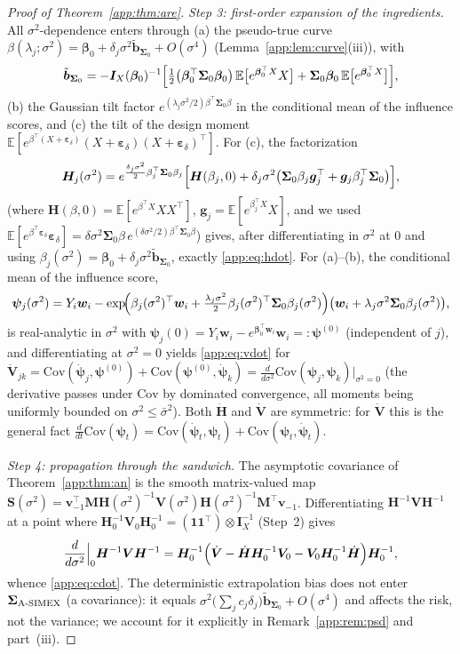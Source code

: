 \documentclass[11pt]{article}
\theoremstyle{plain}
\theoremstyle{definition}
\newcommand{\E}{\mathbb{E}}
\newcommand{\Cov}{\mathrm{Cov}}
\newcommand{\bet}{\bm{\beta}}
\newcommand{\beps}{\bm{\varepsilon}}
\newcommand{\bSig}{\bm{\Sigma}}
\newcommand{\btH}{\bm{H}}
\newcommand{\btV}{\bm{V}}
\newcommand{\asimex}{\textup{A-SIMEX}}
\begin{document}
\begin{proof}[Proof of Theorem~\ref{app:thm:are}]
\emph{Step 3: first-order expansion of the ingredients.} All
$\sigma^2$-dependence enters through (a) the pseudo-true curve
$\beta(\lambda_j;\sigma^2)=\bet_0+\delta_j\sigma^2
\tilde{\bm b}_{\bSig_0}+O(\sigma^4)$ (Lemma~\ref{app:lem:curve}(iii)),
with
\[
  \tilde{\bm b}_{\bSig_0}
  =-\bm I_X(\bet_0)^{-1}\Bigl[
    \tfrac12\bigl(\bet_0^\top\bSig_0\bet_0\bigr)\,
    \E\bigl[e^{\bet_0^\top X}X\bigr]
    +\bSig_0\bet_0\,\E\bigl[e^{\bet_0^\top X}\bigr]\Bigr],
\]
(b) the Gaussian tilt factor
$e^{(\lambda_j\sigma^2/2)\beta^\top\bSig_0\beta}$ in the conditional
mean of the influence scores, and (c) the tilt of the design moment
$\E[e^{\beta^\top(X+\beps_\delta)}(X+\beps_\delta)(X+\beps_\delta)^\top]$.
For (c), the factorization
\[
  \bm H_j(\sigma^2)
  =e^{\frac{\delta_j\sigma^2}{2}\beta_j^\top\bSig_0\beta_j}
   \Bigl[\bm H(\beta_j,0)
    +\delta_j\sigma^2\bigl(\bSig_0\beta_j\bm g_j^\top
      +\bm g_j\beta_j^\top\bSig_0\bigr)\Bigr],
\]
(where $\bm H(\beta,0)=\E[e^{\beta^\top X}XX^\top]$,
$\bm g_j=\E[e^{\beta_j^\top X}X]$, and we used
$\E[e^{\beta^\top\beps_\delta}\beps_\delta]
=\delta\sigma^2\bSig_0\beta\,e^{(\delta\sigma^2/2)\beta^\top\bSig_0\beta}$)
gives, after differentiating in $\sigma^2$ at $0$ and using
$\beta_j(\sigma^2)=\bet_0+\delta_j\sigma^2\tilde{\bm b}_{\bSig_0}$,
exactly \eqref{app:eq:hdot}. For (a)--(b), the conditional mean of the
influence score,
\[
  \bm\psi_j(\sigma^2)
  =Y_i\bm w_i
  -\exp\!\Bigl(\beta_j(\sigma^2)^\top\bm w_i
   +\tfrac{\lambda_j\sigma^2}{2}
    \beta_j(\sigma^2)^\top\bSig_0\beta_j(\sigma^2)\Bigr)
   \bigl(\bm w_i+\lambda_j\sigma^2\bSig_0\beta_j(\sigma^2)\bigr),
\]
is real-analytic in $\sigma^2$ with
$\bm\psi_j(0)=Y_i\bm w_i-e^{\bet_0^\top\bm w_i}\bm w_i=:\bm\psi^{(0)}$
(independent of $j$), and differentiating at $\sigma^2=0$ yields
\eqref{app:eq:vdot} for
$\dot{\btV}_{jk}=\Cov(\dot{\bm\psi}_j,\bm\psi^{(0)})
+\Cov(\bm\psi^{(0)},\dot{\bm\psi}_k)
=\frac{d}{d\sigma^2}\Cov(\bm\psi_j,\bm\psi_k)\big|_{\sigma^2=0}$
(the derivative passes under $\Cov$ by dominated convergence, all
moments being uniformly bounded on $\sigma^2\le\bar\sigma^2$). Both
$\dot{\btH}$ and $\dot{\btV}$ are symmetric: for $\dot{\btV}$ this is
the general fact $\frac{d}{dt}\Cov(\bm\psi_t)
=\Cov(\dot{\bm\psi}_t,\bm\psi_t)+\Cov(\bm\psi_t,\dot{\bm\psi}_t)$.

\emph{Step 4: propagation through the sandwich.} The asymptotic
covariance of Theorem~\ref{app:thm:an} is the smooth matrix-valued map
$\bm S(\sigma^2)=\bm v_{-1}^\top\bm M\btH(\sigma^2)^{-1}
\btV(\sigma^2)\btH(\sigma^2)^{-1}\bm M^\top\bm v_{-1}$. Differentiating
$\bm H^{-1}\bm V\bm H^{-1}$ at a point where
$\bm H_0^{-1}\bm V_0\bm H_0^{-1}
=(\bm 1\bm 1^\top)\otimes\bm I_X^{-1}$ (Step~2) gives
\[
  \frac{d}{d\sigma^2}\Big|_{0}\bm H^{-1}\bm V\bm H^{-1}
  =\bm H_0^{-1}\Bigl(\dot{\btV}
    -\dot{\btH}\bm H_0^{-1}\bm V_0
    -\bm V_0\bm H_0^{-1}\dot{\btH}\Bigr)\bm H_0^{-1},
\]
whence \eqref{app:eq:cdot}. The deterministic extrapolation bias does not
enter $\bSig_{\asimex}$ (a covariance): it equals
$\sigma^2\bigl(\sum_jc_j\delta_j\bigr)\tilde{\bm b}_{\bSig_0}+O(\sigma^4)$
and affects the risk, not the variance; we account for it explicitly in
Remark~\ref{app:rem:psd} and part~(iii).


\end{proof}
\end{document}
